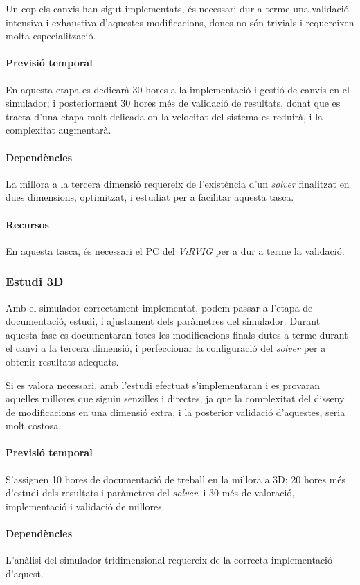 \documentclass[a4paper]{article} %
\begin{document}
	Un cop els canvis han sigut implementats, és necessari dur a terme una validació intensiva i exhaustiva d'aquestes modificacions, doncs no són trivials i requereixen molta especialització.
	\paragraph{\quad Previsió temporal} En aquesta etapa es dedicarà 30 hores a la implementació i gestió de canvis en el simulador; i posteriorment 30 hores més de validació de resultats, donat que es tracta d'una etapa molt delicada on la velocitat del sistema es reduirà, i la complexitat augmentarà.
	\paragraph{\quad Dependències} La millora a la tercera dimensió requereix de l'existència d'un \textit{solver} finalitzat en dues dimensions, optimitzat, i estudiat per a facilitar aquesta tasca.
	\paragraph{\quad Recursos} En aquesta tasca, és necessari el PC del \textit{ViRVIG} per a dur a terme la validació.
	
	\subsubsection{Estudi 3D}
	Amb el simulador correctament implementat, podem passar a l'etapa de documentació, estudi, i ajustament dels paràmetres del simulador. Durant aquesta fase es documentaran totes les modificacions finals dutes a terme durant el canvi a la tercera dimensió, i perfeccionar la configuració del \textit{solver} per a obtenir resultats adequats. \par
	Si es valora necessari, amb l'estudi efectuat s'implementaran i es provaran aquelles millores que siguin senzilles i directes, ja que la complexitat del disseny de modificacions en una dimensió extra, i la posterior validació d'aquestes, seria molt costosa.
	\paragraph{\quad Previsió temporal} S'assignen 10 hores de documentació de treball en la millora a 3D; 20 hores més d'estudi dels resultats i paràmetres del \textit{solver}, i 30 més de valoració, implementació i validació de millores.
	\paragraph{\quad Dependències} L'anàlisi del simulador tridimensional requereix de la correcta implementació d'aquest.
\end{document}
